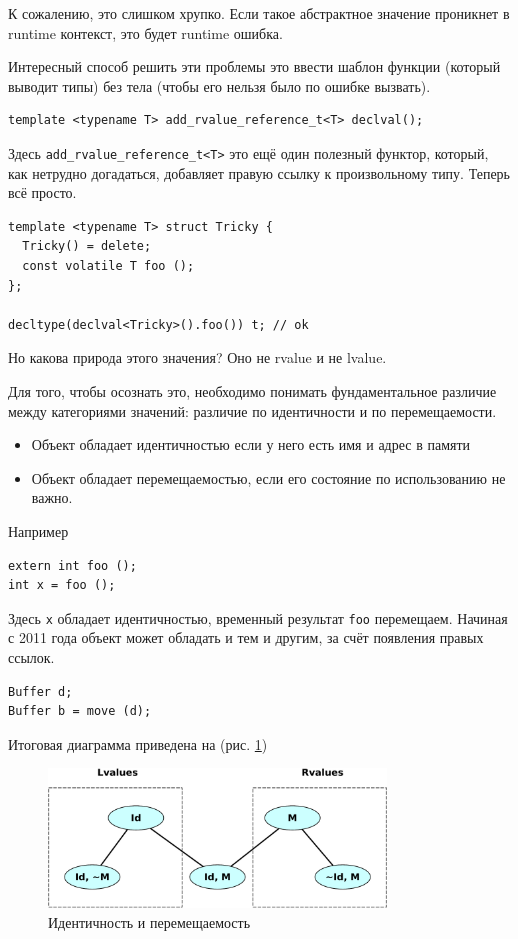 \documentclass[a4paper,12pt,oneside]{book}
\begin{document}
К сожалению, это слишком хрупко. Если такое абстрактное значение проникнет в runtime контекст, это будет runtime ошибка.

Интересный способ решить эти проблемы это ввести шаблон функции (который выводит типы) без тела (чтобы его нельзя было по ошибке вызвать).

\begin{lstlisting}
template <typename T> add_rvalue_reference_t<T> declval();
\end{lstlisting}

Здесь \lstinline!add_rvalue_reference_t<T>! это ещё один полезный функтор, который, как нетрудно догадаться, добавляет правую ссылку к произвольному типу. Теперь всё просто.

\begin{lstlisting}
template <typename T> struct Tricky {
  Tricky() = delete;
  const volatile T foo ();
};

decltype(declval<Tricky>().foo()) t; // ok
\end{lstlisting}

Но какова природа этого значения? Оно не rvalue и не lvalue.

Для того, чтобы осознать это, необходимо понимать фундаментальное различие между категориями значений: различие по идентичности и по перемещаемости.

\begin{itemize}
\item Объект обладает идентичностью если у него есть имя и адрес в памяти
\item Объект обладает перемещаемостью, если его состояние по использованию не важно.
\end{itemize}

Например

\begin{lstlisting}
extern int foo ();
int x = foo (); 
\end{lstlisting}

Здесь \lstinline!x! обладает идентичностью, временный результат \lstinline!foo! перемещаем.
Начиная с 2011 года объект может обладать и тем и другим, за счёт появления правых ссылок.

\begin{lstlisting}
Buffer d;
Buffer b = move (d);
\end{lstlisting}

Итоговая диаграмма приведена на (рис. \ref{fig:rvref-identity})

\begin{figure}[ht]
\centering
\includegraphics[width=0.8\textwidth]{illustrations/rvref-identity-crop.pdf}
\caption{Идентичность и перемещаемость}
\label{fig:rvref-identity}
\end{figure}
\end{document}
